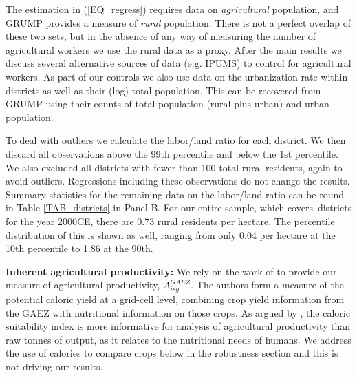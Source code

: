 \documentclass[12pt]{article}
\begin{document}
The estimation in (\ref{EQ_regress}) requires data on \textit{agricultural} population, and GRUMP provides a measure of \textit{rural} population. There is not a perfect overlap of these two sets, but in the absence of any way of measuring the number of agricultural workers we use the rural data as a proxy. After the main results we discuss several alternative sources of data (e.g. IPUMS) to control for agricultural workers. As part of our controls we also use data on the urbanization rate within districts as well as their (log) total population. This can be recovered from GRUMP using their counts of total population (rural plus urban) and urban population.

To deal with outliers we calculate the labor/land ratio for each district. We then discard all observations above the 99th percentile and below the 1st percentile. We also excluded all districts with fewer than 100 total rural residents, again to avoid outliers. Regressions including these observations do not change the results. Summary statistics for the remaining data on the labor/land ratio can be round in Table \ref{TAB_districts} in Panel B. For our entire sample, which covers\districts \ districts for the year 2000CE, there are 0.73 rural residents per hectare. The percentile distribution of this is shown as well, ranging from only 0.04 per hectare at the 10th percentile to 1.86 at the 90th. 

\vspace{.5cm}\noindent\textbf{Inherent agricultural productivity:} We rely on the work of \citet{galorozak2016} to provide our measure of agricultural productivity, $A^{GAEZ}_{isg}$. The authors form a measure of the potential caloric yield at a grid-cell level, combining crop yield information from the GAEZ with nutritional information on those crops. As argued by \citet{galorozak2016}, the caloric suitability index is more informative for analysis of agricultural productivity than raw tonnes of output, as it relates to the nutritional needs of humans. We address the use of calories to compare crops below in the robustness section and this is not driving our results.
\end{document}
